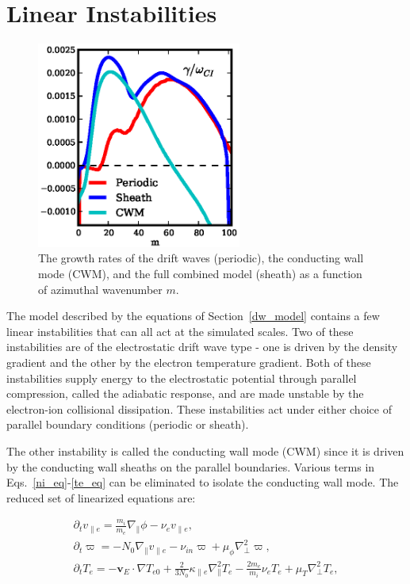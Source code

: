 \documentclass[showpacs,preprintnumbers,amsmath,amssymb,superscriptaddress,aip]{revtex4-1}
\def\beqar{\begin{eqnarray}}
\def\eeqar{\end{eqnarray}}
\newcommand{\pdt}{\partial_t}
\def\grad{\nabla}
\newcommand{\gradpar}{\grad_\parallel}
\newcommand{\gradperp}{\grad_\perp}
\newcommand{\vpe}{v_{\parallel e}}
\newcommand{\nue}{\nu_{e}}
\newcommand{\nuin}{\nu_{in}}
\newcommand{\kpe}{\kappa_{\parallel e}}
\newcommand{\fmie}{\frac{m_i}{m_e}}
\begin{document}
\section{Linear Instabilities}
\label{sec_linear}

\begin{figure}[!htbp]
\includegraphics[width=0.6\textwidth]{gamma_comparisons}
\hfil
\caption{The growth rates of the drift waves (periodic), the conducting wall mode (CWM), and the full combined model (sheath) as a function of azimuthal wavenumber $m$.}
\label{drift_cwm_gamma}
\end{figure}


The model described by the equations of Section~\ref{dw_model} contains a few linear instabilities that can all act at the simulated scales. Two of these instabilities are of the electrostatic
drift wave type - one is driven by the density gradient and the other by the electron temperature gradient. Both of these instabilities supply energy to the electrostatic potential through parallel
compression, called the adiabatic response, and are made unstable by the electron-ion collisional dissipation. These instabilities act under either choice of parallel boundary conditions 
(periodic or sheath).

The other instability is called the conducting wall mode (CWM) since it is driven by the conducting wall sheaths on the parallel boundaries. Various terms in Eqs.~\ref{ni_eq}-\ref{te_eq} 
can be eliminated to isolate the conducting wall mode. The reduced set of linearized equations are:

\beqar
\label{ve_eq2}
\pdt \vpe = \fmie \gradpar \phi - \nue \vpe, \\
\label{rho_eq2}
\pdt \varpi = - N_0 \gradpar \vpe - \nuin \varpi + \mu_\phi \gradperp^2 \varpi, \\
\label{te_eq2}
\pdt T_e = - {\mathbf v_E} \cdot \grad T_{e0} + \frac{2}{3 N_0} \kpe \gradpar^2 T_e  - \frac{2 m_e}{m_i} \nue T_e  + \mu_T \gradperp^2 T_e,
\eeqar
\end{document}

